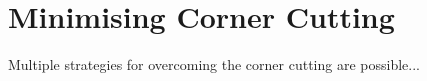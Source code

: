 \section{Minimising Corner Cutting}
\label{sec:erm-corner-cutting}

Multiple strategies for overcoming the corner cutting are possible...
\placeholder
